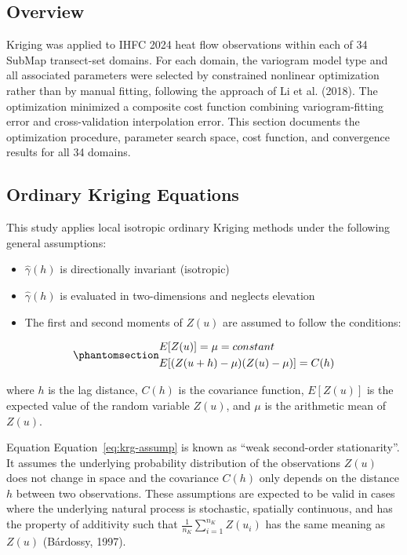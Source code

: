 \documentclass[final]{agujournal2019}
\providecommand{\tightlist}{\setlength{\itemsep}{0pt}\setlength{\parskip}{0pt}}
\begin{document}
\subsection*{Overview}\label{sec:overview}

Kriging was applied to IHFC 2024 heat flow observations within each of
34 SubMap transect-set domains. For each domain, the variogram model
type and all associated parameters were selected by constrained
nonlinear optimization rather than by manual fitting, following the
approach of Li et al. (2018). The optimization minimized a composite
cost function combining variogram-fitting error and cross-validation
interpolation error. This section documents the optimization procedure,
parameter search space, cost function, and convergence results for all
34 domains.

\subsection*{Ordinary Kriging
Equations}\label{sec:ordinary-kriging-equations}

This study applies local isotropic ordinary Kriging methods under the
following general assumptions:

\begin{itemize}
\tightlist
\item
  \(\hat{\gamma}(h)\) is directionally invariant (isotropic)
\item
  \(\hat{\gamma}(h)\) is evaluated in two-dimensions and neglects
  elevation
\item
  The first and second moments of \(Z(u)\) are assumed to follow the
  conditions:
\end{itemize}

\begin{equation}\protect\phantomsection\label{eq:krg-assump}{
  \begin{aligned}
    &E[Z(u)] = \mu = constant \\
    &E[(Z(u + h) - \mu)(Z(u) - \mu)] = C(h)
  \end{aligned}
}\end{equation}

where \(h\) is the lag distance, \(C(h)\) is the covariance function,
\(E[Z(u)]\) is the expected value of the random variable \(Z(u)\), and
\(\mu\) is the arithmetic mean of \(Z(u)\).

Equation Equation~\ref{eq:krg-assump} is known as ``weak second-order
stationarity''. It assumes the underlying probability distribution of
the observations \(Z(u)\) does not change in space and the covariance
\(C(h)\) only depends on the distance \(h\) between two observations.
These assumptions are expected to be valid in cases where the underlying
natural process is stochastic, spatially continuous, and has the
property of additivity such that
\(\frac{1}{n_K}\sum_{i=1}^{n_K} Z(u_i)\) has the same meaning as
\(Z(u)\) (Bárdossy, 1997).
\end{document}

